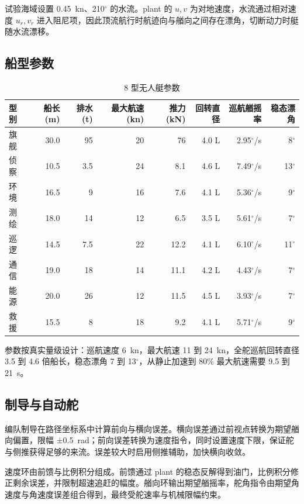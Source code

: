 \documentclass[UTF8, a4paper, 11pt]{ctexart}
\begin{document}
试验海域设置 0.45~kn、210$^\circ$ 的水流。plant 的 $u,v$ 为对地速度，水流通过相对速度 $u_r,v_r$ 进入阻尼项，因此顶流航行时航迹向与艏向之间存在漂角，切断动力时艇随水流漂移。

\subsection{船型参数}

\begin{table}[H]
\centering
\caption{8 型无人艇参数}
\label{tab:usv-params}
\small
\begin{tabular}{@{}lrrrrrrr@{}}
\toprule
\textbf{型别} & 船长 (m) & 排水 (t) & 最大航速 (kn) & 推力 (kN) & 回转直径 & 巡航艏摇率 & 稳态漂角 \\
\midrule
旗舰 & 30.0 & 95 & 20 & 76 & 4.0 L & 2.95$^\circ$/s & 8$^\circ$ \\
侦察 & 10.5 & 3.5 & 24 & 8.1 & 4.6 L & 7.49$^\circ$/s & 13$^\circ$ \\
环境 & 16.5 & 9 & 16 & 7.6 & 4.1 L & 5.36$^\circ$/s & 9$^\circ$ \\
测绘 & 18.0 & 14 & 12 & 6.5 & 3.5 L & 5.61$^\circ$/s & 7$^\circ$ \\
巡逻 & 14.5 & 7.5 & 22 & 12.2 & 4.1 L & 6.10$^\circ$/s & 11$^\circ$ \\
通信 & 19.0 & 18 & 14 & 11.1 & 4.2 L & 4.43$^\circ$/s & 7$^\circ$ \\
能源 & 20.0 & 26 & 12 & 11.5 & 4.5 L & 3.93$^\circ$/s & 7$^\circ$ \\
救援 & 15.5 & 8 & 18 & 9.2 & 4.1 L & 5.71$^\circ$/s & 9$^\circ$ \\
\bottomrule
\end{tabular}
\end{table}

参数按真实量级设计：巡航速度 6~kn，最大航速 11 到 24~kn，全舵巡航回转直径 3.5 到 4.6 倍船长，稳态漂角 7 到 13$^\circ$，从静止加速到 80\% 最大航速需要 9.5 到 21~s。

\subsection{制导与自动舵}

编队制导在路径坐标系中计算前向与横向误差。横向误差通过前视点转换为期望艏向偏置，限幅 ±0.5~rad；前向误差转换为速度指令，同时设置速度下限，保证舵与侧推获得足够的来流。误差较大时启用侧推辅助，加快横向收敛。

速度环由前馈与比例积分组成。前馈通过 plant 的稳态反解得到油门，比例积分修正剩余误差，并限制超速追赶的幅度。艏向环输出期望艏摇率，舵角指令由期望角速度与角速度误差组合得到，最终受舵速率与机械限幅约束。
\end{document}
